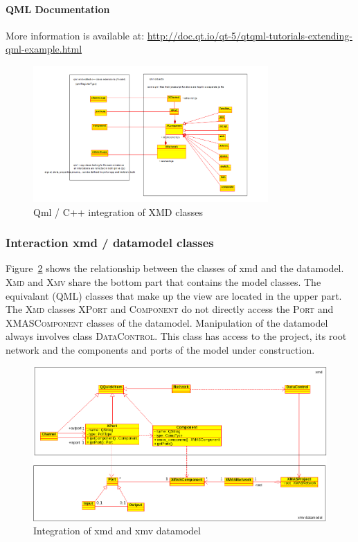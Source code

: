 \paragraph{QML Documentation}
More information is available at:
\url{http://doc.qt.io/qt-5/qtqml-tutorials-extending-qml-example.html}


\begin{figure}
    \centering
    \includegraphics[width=0.8\textwidth]{qml-cpp-extension}
    \caption{Qml / C++ integration of XMD classes}
    \label{fig:qml-cpp-classes}
\end{figure}

\subsubsection{Interaction xmd / datamodel classes}

Figure~\ref{fig:xmd-xmv-integration} shows the relationship between the classes of
xmd and the datamodel. \textsc{Xmd} and \textsc{Xmv} share the bottom part that contains
the model classes.
The equivalant (QML) classes that make up the view are
located in the upper part. The \textsc{Xmd} classes \textsc{XPort} and \textsc{Component}
do not directly access the \textsc{Port} and \textsc{XMASComponent} classes of the datamodel. 
Manipulation of the datamodel always involves class \textsc{DataControl}. This class has 
access to the project, its root network and the components and ports of the model under 
construction.

\begin{figure}[ht]
    \includegraphics[width=\textwidth]{xmd-xmv-integration}
    \caption{Integration of xmd and xmv datamodel}
    \label{fig:xmd-xmv-integration}
\end{figure}

